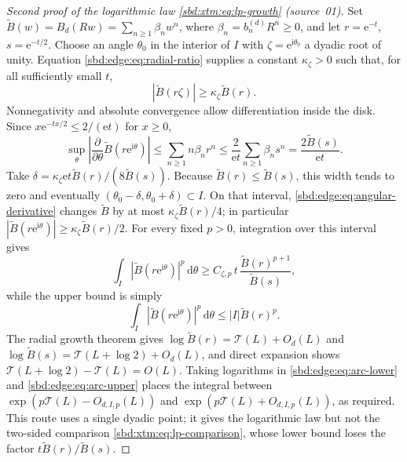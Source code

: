 \documentclass[11pt,a4paper]{article}
\theoremstyle{definition}
\newcommand{\e}{\mathrm e}
\newcommand{\ii}{\mathrm i}
\newcommand{\dd}{\,\mathrm d}
\begin{document}
\begin{proof}[Second proof of the logarithmic law \eqref{sbd:xtm:eq:lp-growth} (source~01)]
Set $\widetilde B(w)=B_d(Rw)=\sum_{n\ge1}\beta_nw^n$, where
$\beta_n=b_n^{(d)}R^n\ge0$, and let $r=\e^{-t}$, $s=\e^{-t/2}$. Choose an
angle $\theta_0$ in the interior of $I$ with $\zeta=\e^{\ii\theta_0}$ a
dyadic root of unity. Equation \eqref{sbd:edge:eq:radial-ratio} supplies a
constant $\kappa_\zeta>0$ such that, for all sufficiently small $t$,
\begin{equation}\label{sbd:edge:eq:arc-point}
 |\widetilde B(r\zeta)|\ge\kappa_\zeta \widetilde B(r).
\end{equation}
Nonnegativity and absolute convergence allow differentiation inside the
disk. Since $x\e^{-tx/2}\le2/(\e t)$ for $x\ge0$,
\begin{equation}\label{sbd:edge:eq:angular-derivative}
 \sup_\theta
 \left|\frac{\partial}{\partial\theta}\widetilde B(r\e^{\ii\theta})\right|
 \le\sum_{n\ge1}n\beta_nr^n
 \le\frac{2}{\e t}\sum_{n\ge1}\beta_ns^n
 =\frac{2\widetilde B(s)}{\e t}.
\end{equation}
Take $\delta=\kappa_\zeta\e t\widetilde B(r)/(8\widetilde B(s))$. Because
$\widetilde B(r)\le\widetilde B(s)$, this width tends to zero and eventually
$(\theta_0-\delta,\theta_0+\delta)\subset I$. On that interval,
\eqref{sbd:edge:eq:angular-derivative} changes $\widetilde B$ by at most
$\kappa_\zeta\widetilde B(r)/4$; in particular
$|\widetilde B(r\e^{\ii\theta})|\ge\kappa_\zeta\widetilde B(r)/2$. For every
fixed $p>0$, integration over this interval gives
\begin{equation}\label{sbd:edge:eq:arc-lower}
 \int_I|\widetilde B(r\e^{\ii\theta})|^p\dd\theta
 \ge
 C_{\zeta,p}\,t\,
 \frac{\widetilde B(r)^{p+1}}{\widetilde B(s)},
\end{equation}
while the upper bound is simply
\begin{equation}\label{sbd:edge:eq:arc-upper}
 \int_I|\widetilde B(r\e^{\ii\theta})|^p\dd\theta
 \le |I|\widetilde B(r)^p.
\end{equation}
The radial growth theorem gives $\log\widetilde B(r)=\mathcal T(L)+O_d(L)$
and $\log\widetilde B(s)=\mathcal T(L+\log2)+O_d(L)$, and direct expansion
shows $\mathcal T(L+\log2)-\mathcal T(L)=O(L)$. Taking logarithms in
\eqref{sbd:edge:eq:arc-lower} and \eqref{sbd:edge:eq:arc-upper} places the
integral between $\exp(p\mathcal T(L)-O_{d,I,p}(L))$ and
$\exp(p\mathcal T(L)+O_{d,I,p}(L))$, as required. This route uses a single
dyadic point; it gives the logarithmic law but not the two-sided
comparison \eqref{sbd:xtm:eq:lp-comparison}, whose lower bound loses the
factor $t\widetilde B(r)/\widetilde B(s)$.
\end{proof}
\end{document}
